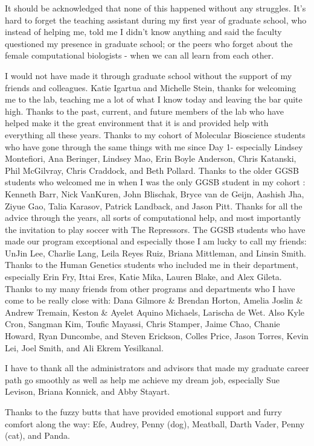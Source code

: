 It should be acknowledged that none of this happened without any struggles. It's hard to forget the teaching assistant during my first year of graduate school, who instead of helping me, told me I didn't know anything and said the faculty questioned my presence in graduate school; or the peers who forget about the female computational biologists - when we can all learn from each other.

I would not have made it through graduate school without the support of my friends and colleagues. Katie Igartua and Michelle Stein, thanks for welcoming me to the lab, teaching me a lot of what I know today and leaving the bar quite high. Thanks to the past, current, and future members of the lab who have helped make it the great environment that it is and provided help with everything all these years. Thanks to my cohort of Molecular Bioscience students who have gone through the same things with me since Day 1- especially Lindsey Montefiori, Ana Beringer, Lindsey Mao, Erin Boyle Anderson, Chris Katanski, Phil McGilvray, Chris Craddock, and Beth Pollard. Thanks to the older GGSB students who welcomed me in when I was the only GGSB student in my cohort : Kenneth Barr, Nick VanKuren, John Blischak, Bryce van de Geijn, Aashish Jha, Ziyue Gao, Talia Karasov, Patrick Landback, and Jason Pitt. Thanks for all the advice through the years, all sorts of computational help, and most importantly the invitation to play soccer with The Repressors. The GGSB students who have made our program exceptional and especially those I am lucky to call my friends: UnJin Lee, Charlie Lang, Leila Reyes Ruiz, Briana Mittleman, and Linsin Smith. Thanks to the Human Genetics students who included me in their department, especially Erin Fry, Ittai Eres, Katie Mika, Lauren Blake, and Alex Gileta. 
Thanks to my many friends from other programs and departments who I have come to be really close with: Dana Gilmore \& Brendan Horton, Amelia Joslin \& Andrew Tremain, Keston \& Ayelet Aquino Michaels, Larischa de Wet. Also Kyle Cron, Sangman Kim, Toufic Mayassi, Chris Stamper, Jaime Chao, Chanie Howard, Ryan Duncombe, and Steven Erickson, Colles Price, Jason Torres, Kevin Lei, Joel Smith, and Ali Ekrem Yesilkanal. 

I have to thank all the administrators and advisors that made my graduate career path go smoothly as well as help me achieve my dream job, especially Sue Levison, Briana Konnick, and Abby Stayart. 

Thanks to the fuzzy butts that have provided emotional support and furry comfort along the way: Efe, Audrey, Penny (dog), Meatball, Darth Vader, Penny (cat), and Panda.

